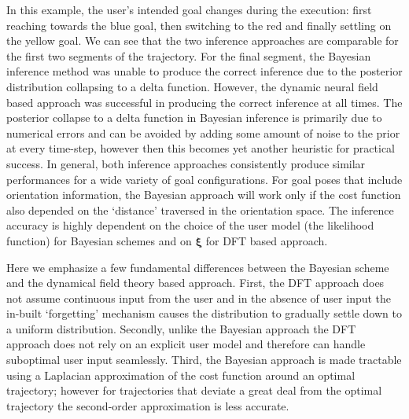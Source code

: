 \documentclass[natbib, twocolumn]{svjour3}          %
\begin{document}
In this example, the user's intended goal changes during the execution: first reaching towards the blue goal, then switching to the red and finally settling on the yellow goal. We can see that the two inference approaches are comparable for the first two segments of the trajectory. For the final segment, the Bayesian inference method was unable to produce the correct inference due to the posterior distribution  collapsing to a delta function. However, the dynamic neural field based approach was successful in producing the correct inference at all times. The posterior collapse to a delta function in Bayesian inference is primarily due to numerical errors and can be avoided by adding some amount of noise to the prior at every time-step, however then this becomes yet another heuristic for practical success. In general, both inference approaches consistently produce similar performances for a wide variety of goal configurations. For goal poses that include orientation information, the Bayesian approach will work only if the cost function also depended on the `distance' traversed in the orientation space. The inference accuracy is highly dependent on the choice of the user model (the likelihood function) for Bayesian schemes and on $\boldsymbol{\xi}$ for DFT based approach. 

Here we emphasize a few fundamental differences between the Bayesian scheme and the dynamical field theory based approach. First, the DFT approach does not assume continuous input from the user and in the absence of user input the in-built `forgetting' mechanism causes the distribution to gradually settle down to a uniform distribution. Secondly, unlike the Bayesian approach the DFT approach does not rely on an explicit user model and therefore can handle suboptimal user input seamlessly. Third, the Bayesian approach is made tractable using a Laplacian approximation of the cost function around an optimal trajectory; however for trajectories that deviate a great deal from the optimal trajectory the second-order approximation is less accurate.  
%
\end{document}
